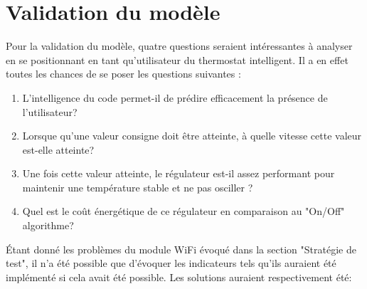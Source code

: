 \documentclass[11pt,a4paper,11pt]{report}
\begin{document}
\section{Validation du modèle}

Pour la validation du modèle, quatre questions seraient intéressantes à analyser en se positionnant en tant qu'utilisateur du thermostat intelligent. Il a en effet toutes les chances de se poser les questions suivantes :\\

\begin{enumerate}
\item L'intelligence du code permet-il de prédire efficacement la présence de l'utilisateur?\\
\item Lorsque qu'une valeur consigne doit être atteinte, à quelle vitesse cette valeur est-elle atteinte?\\
\item Une fois cette valeur atteinte, le régulateur est-il assez performant pour maintenir une température stable et ne pas osciller ?\\
\item Quel est le coût énergétique de ce régulateur en comparaison au "On/Off" algorithme?\\

\end{enumerate}

Étant donné les problèmes du module WiFi évoqué dans la section "Stratégie de test", il n'a été possible que d'évoquer les indicateurs tels qu'ils auraient été implémenté si cela avait été possible. Les solutions auraient respectivement été:
\end{document}
